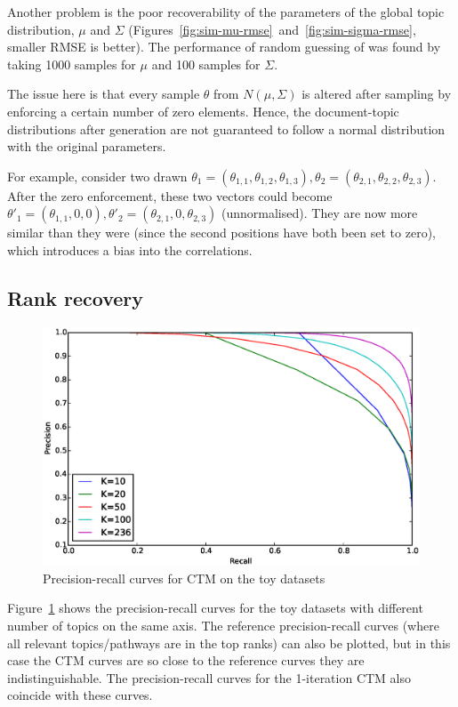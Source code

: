 \documentclass[12pt,a4paper,twoside,openright]{report}
\begin{document}
Another problem is the poor recoverability of the parameters of the global topic distribution, $\mu$ and $\Sigma$ (Figures~\ref{fig:sim-mu-rmse}~and~\ref{fig:sim-sigma-rmse}, smaller RMSE is better). The performance of random guessing of was found by taking 1000 samples for $\mu$ and 100 samples for $\Sigma$.

The issue here is that every sample $\theta$ from $N(\mu, \Sigma)$ is altered after sampling by enforcing a certain number of zero elements. Hence, the document-topic distributions after generation are not guaranteed to follow a normal distribution with the original parameters.

For example, consider two drawn $\theta_1 = (\theta_{1,1}, \theta_{1,2}, \theta_{1,3}), \theta_2 = (\theta_{2,1}, \theta_{2,2}, \theta_{2,3})$. After the zero enforcement, these two vectors could become $\theta'_1 = (\theta_{1,1}, 0, 0), \theta'_2 = (\theta_{2,1}, 0, \theta_{2,3})$ (unnormalised). They are now more similar than they were (since the second positions have both been set to zero), which introduces a bias into the correlations.

\subsection{Rank recovery}

\begin{figure}[!htb]
\includegraphics[width=\textwidth]{sim-pr-curves-all.eps}
\caption{Precision-recall curves for CTM on the toy datasets}
\label{fig:sim-pr-curves-all}
\end{figure}

Figure~\ref{fig:sim-pr-curves-all} shows the precision-recall curves for the toy datasets with different number of topics on the same axis. The reference precision-recall curves (where all relevant topics/pathways are in the top ranks) can also be plotted, but in this case the CTM curves are so close to the reference curves they are indistinguishable. The precision-recall curves for the 1-iteration CTM also coincide with these curves.
\end{document}
